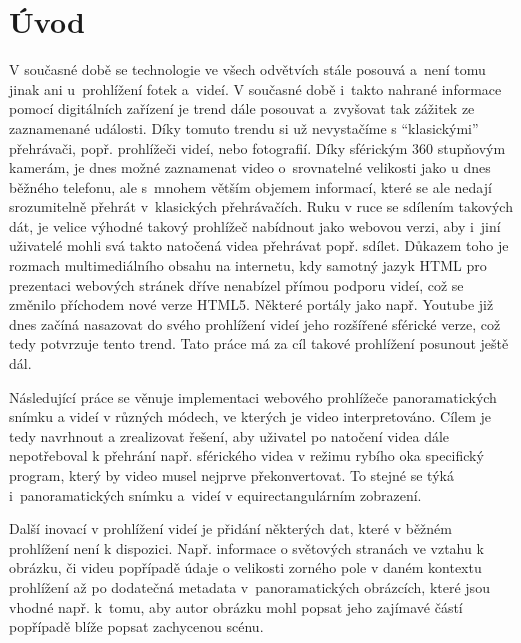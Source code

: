 \setcounter{secnumdepth}{4} %

\chapter{Úvod}
\label{chapter:1}

V současné době se technologie ve všech odvětvích stále posouvá a~není tomu jinak ani u~prohlížení fotek a~videí. V současné době i~takto nahrané informace pomocí digitálních zařízení je trend dále posouvat a~zvyšovat tak zážitek ze zaznamenané události. Díky tomuto trendu si už nevystačíme s ``klasickými''  přehrávači, popř. prohlížeči videí, nebo fotografií. Díky sférickým 360 stupňovým kamerám, je dnes možné zaznamenat video o~srovnatelné velikosti jako u dnes běžného telefonu, ale s~mnohem větším objemem informací, které se ale nedají srozumitelně přehrát v~klasických přehrávačích. Ruku v ruce se sdílením takových dát, je velice výhodné takový prohlížeč nabídnout jako webovou verzi, aby i~jiní uživatelé mohli svá takto natočená videa přehrávat popř. sdílet. Důkazem toho je rozmach multimediálního obsahu na internetu, kdy samotný jazyk HTML pro prezentaci webových stránek dříve nenabízel přímou podporu videí, což se změnilo příchodem nové verze HTML5. Některé portály jako např. Youtube již dnes začíná nasazovat do svého prohlížení videí jeho rozšířené sférické verze, což tedy potvrzuje tento trend. Tato práce má za cíl takové prohlížení posunout ještě dál.


Následující práce se věnuje implementaci webového prohlížeče panoramatických snímku a videí v různých módech, ve kterých je video interpretováno. Cílem je tedy navrhnout a zrealizovat řešení, aby uživatel po natočení videa dále nepotřeboval k přehrání např. sférického videa v režimu rybího oka specifický program, který by video musel nejprve překonvertovat. To stejné se týká i~panoramatických snímku a~videí v equirectangulárním zobrazení.  


Další inovací v prohlížení videí je přidání některých dat, které v běžném prohlížení není k dispozici. Např. informace o světových stranách ve vztahu k obrázku, či videu popřípadě údaje o velikosti zorného pole v daném kontextu prohlížení až po dodatečná metadata v~panoramatických obrázcích, které jsou vhodné např. k~tomu, aby autor obrázku mohl popsat jeho zajímavé částí popřípadě blíže popsat zachycenou scénu.
\newline

